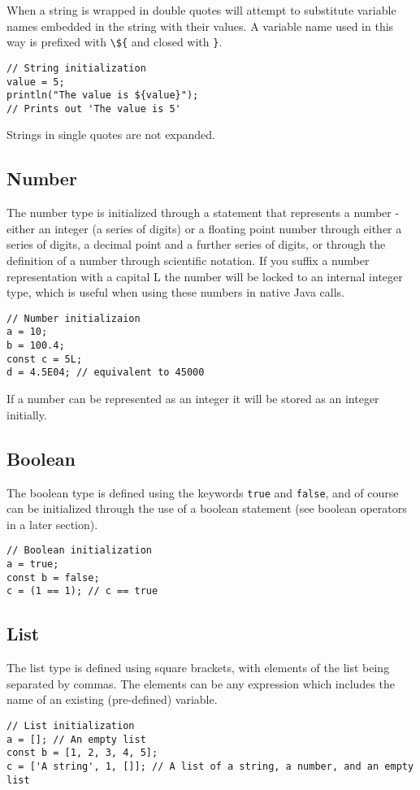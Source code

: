 When a string is wrapped in double quotes \Reflex will attempt to substitute variable names embedded in the string with their values. A variable
name used in this way is prefixed with \Verb+\${+ and closed with \Verb+}+.

\begin{lstlisting}[caption={String interpretation}]
// String initialization
value = 5;
println("The value is ${value}");
// Prints out 'The value is 5'
\end{lstlisting}

Strings in single quotes are not expanded.

\subsection{Number}
The number  type is initialized through a statement that represents a number - either an integer (a series of digits) or a floating point number through either a series of digits, a decimal point and a further series of digits, or through the definition of a number through scientific notation. If you suffix a number representation with a capital L the number will be locked to an internal integer  type, which is useful when using these numbers in native Java calls.
\begin{lstlisting}[caption={Number initialization}]
// Number initializaion
a = 10;
b = 100.4;
const c = 5L;
d = 4.5E04; // equivalent to 45000
\end{lstlisting}

If a number can be represented as an integer it will be stored as an integer initially.

\subsection{Boolean}
The boolean  type is defined using the keywords \Verb+true+ and \verb+false+, and of course can be initialized through the use of a boolean statement (see boolean operators in a later section).
\begin{lstlisting}[caption={Boolean initialization}]
// Boolean initialization
a = true;
const b = false;
c = (1 == 1); // c == true
\end{lstlisting}
\subsection{List}
The list  type is defined using square brackets, with elements of the list being separated by commas. The elements can be any expression which includes the name of an existing (pre-defined) variable.
\begin{lstlisting}[caption={List initialization}]
// List initialization
a = []; // An empty list
const b = [1, 2, 3, 4, 5];
c = ['A string', 1, []]; // A list of a string, a number, and an empty list
\end{lstlisting}
